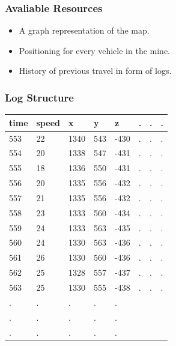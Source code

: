 \documentclass{beamer}
\begin{document}
	\begin{frame}
		\frametitle{Avaliable Resources}
		\begin{itemize}
			\item A graph representation of the map.
			\item Positioning for every vehicle in the mine.
			\item History of previous travel in form of logs.
		\end{itemize}
	\end{frame}

	\begin{frame}
		\frametitle{Log Structure}
		\begin{center}
			\begin{tabular}{|l|l|l|l|l| lll}
				\hline
				time & speed & x & y & z &.&.&.\\
				\hline
				553 & 22 & 1340 & 543 & -430 &.&.&. \\
				554 & 20 & 1338 & 547 & -431 &.&.&.\\
				555 & 18 & 1336 & 550 & -431 &.&.&.\\
				556 & 20 & 1335 & 556 & -432 &.&.&.\\
				557 & 21 & 1335 & 556 & -432 &.&.&.\\
				558 & 23 & 1333 & 560 & -434 &.&.&.\\
				559 & 24 & 1333 & 563 & -435 &.&.&.\\
				560 & 24 & 1330 & 563 & -436 &.&.&.\\
				561 & 26 & 1330 & 560 & -436 &.&.&.\\
				562 & 25 & 1328 & 557 & -437 &.&.&.\\
				563 & 25 & 1330 & 555 & -438 &.&.&.\\
				.&.&.&.&.&&&\\
				.&.&.&.&.&&&\\
				.&.&.&.&.&&&\\

			\end{tabular}

		\end{center}
	\end{frame}
\end{document}
